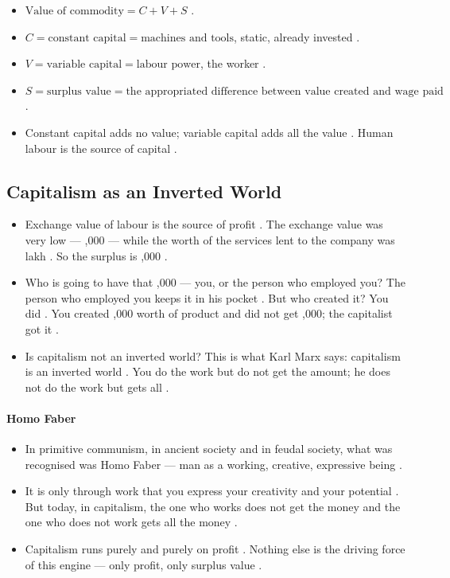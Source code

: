 \begin{QuickRevision}
\begin{itemize}
    \item $\text{Value of commodity} = C + V + S$ .
    \item $C = \text{constant capital} = \text{machines and tools}$, static, already invested .
    \item $V = \text{variable capital} = \text{labour power}$, the worker .
    \item $S = \text{surplus value} = \text{the appropriated difference between value created and wage paid}$ .
    \item Constant capital adds no value; variable capital adds all the value . Human labour is the source of capital .
\end{itemize}
\end{QuickRevision}

\subsection{Capitalism as an Inverted World}
\begin{itemize}
    \item Exchange value of labour is the source of profit . The exchange value was very low --- ,000 --- while the worth of the services lent to the company was  lakh . So the surplus is ,000 .
    \item Who is going to have that ,000 --- you, or the person who employed you?  The person who employed you keeps it in his pocket . But who created it? You did . You created ,000 worth of product and did not get ,000; the capitalist got it .
    \item Is capitalism not an inverted world? This is what Karl Marx says: capitalism is an inverted world . You do the work but do not get the amount; he does not do the work but gets all .
\end{itemize}

\paragraph{Homo Faber}
\begin{itemize}
    \item In primitive communism, in ancient society and in feudal society, what was recognised was Homo Faber --- man as a working, creative, expressive being .
    \item It is only through work that you express your creativity and your potential . But today, in capitalism, the one who works does not get the money and the one who does not work gets all the money .
    \item Capitalism runs purely and purely on profit . Nothing else is the driving force of this engine --- only profit, only surplus value .
\end{itemize}

